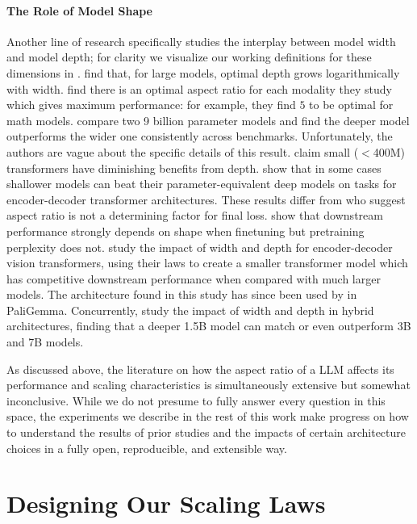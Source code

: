 \documentclass{article}
\begin{document}
\paragraph{The Role of Model Shape}
Another line of research specifically studies the interplay between model width and model depth; for clarity we visualize our working definitions for these dimensions in .
\citet{interplay} find that, for large models, optimal depth grows logarithmically with width.
\citet{henighan2020scaling} find there is an optimal aspect ratio for each modality they study which gives maximum performance: for example, they find \(5\) to be optimal for math models.
\citet{team2024gemma2} compare two 9 billion parameter models and find the deeper model outperforms the wider one consistently across benchmarks. Unfortunately, the authors are vague about the specific details of this result.
\citet{petty2024impact} claim small ($<$400M) transformers have diminishing benefits from depth.
\citet{brown2022wide} show that in some cases shallower models can beat their parameter-equivalent deep models on tasks for encoder-decoder transformer architectures.
These results differ from \citet{kaplan2020scaling} who suggest aspect ratio is not a determining factor for final loss.
\citet{scaleEfficiently} show that downstream performance strongly depends on shape when finetuning but pretraining perplexity does not.
\citet{alabdulmohsin2024getting} study the impact of width and depth for encoder-decoder vision transformers, using their laws to create a smaller transformer model which has competitive downstream performance when compared with much larger models.
The architecture found in this study has since been used by \citet{beyer2024paligemma} in PaliGemma. Concurrently, \citet{zuo2025falcon} study the impact of width and depth in hybrid architectures, finding that a deeper 1.5B model can match or even outperform 3B and 7B models.

As discussed above, the literature on how the aspect ratio of a LLM affects its performance and scaling characteristics is simultaneously extensive but somewhat inconclusive. While we do not presume to fully answer every question in this space, the experiments we describe in the rest of this work make progress on how to understand the results of prior studies and the impacts of certain architecture choices in a fully open, reproducible, and extensible way.

\section{Designing Our Scaling Laws}\label{sec:experimental_setup}
\end{document}
